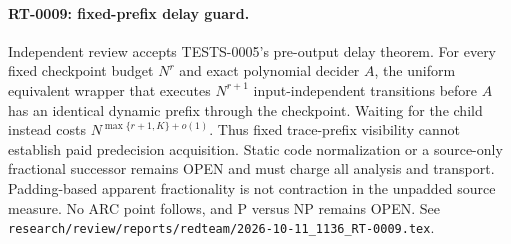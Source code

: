 \paragraph{RT-0009: fixed-prefix delay guard.}
Independent review accepts TESTS-0005's pre-output delay theorem.  For every
fixed checkpoint budget $N^r$ and exact polynomial decider $A$, the uniform
equivalent wrapper that executes $N^{r+1}$ input-independent transitions
before $A$ has an identical dynamic prefix through the checkpoint.  Waiting
for the child instead costs $N^{\max\{r+1,K\}+o(1)}$.  Thus fixed trace-prefix
visibility cannot establish paid predecision acquisition.  Static code
normalization or a source-only fractional successor remains OPEN and must
charge all analysis and transport.  Padding-based apparent fractionality is
not contraction in the unpadded source measure.  No ARC point follows, and P
versus NP remains OPEN.  See
\texttt{research/review/reports/redteam/2026-10-11\_1136\_RT-0009.tex}.
